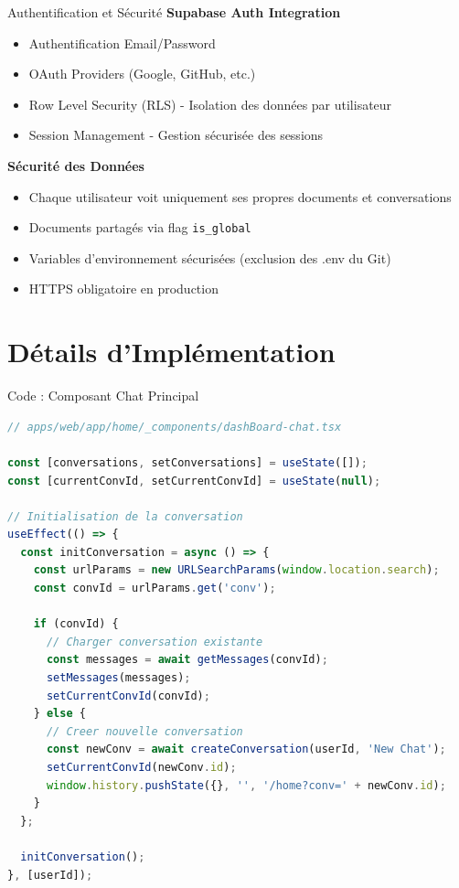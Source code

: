 \documentclass[aspectratio=169]{beamer}
\begin{document}
\begin{frame}{Authentification et Sécurité}
    \textbf{Supabase Auth Integration}
    \begin{itemize}
        \item \textcolor{primaryblue}{Authentification Email/Password}
        \item \textcolor{primaryblue}{OAuth Providers} (Google, GitHub, etc.)
        \item \textcolor{primaryblue}{Row Level Security (RLS)} - Isolation des données par utilisateur
        \item \textcolor{primaryblue}{Session Management} - Gestion sécurisée des sessions
    \end{itemize}
    
    \vspace{0.5cm}
    
    \textbf{Sécurité des Données}
    \begin{itemize}
        \item Chaque utilisateur voit uniquement ses propres documents et conversations
        \item Documents partagés via flag \texttt{is\_global}
        \item Variables d'environnement sécurisées (exclusion des .env du Git)
        \item HTTPS obligatoire en production
    \end{itemize}
\end{frame}

\section{Détails d'Implémentation}

\begin{frame}[fragile]{Code : Composant Chat Principal}
\begin{lstlisting}[language=JavaScript, basicstyle=\ttfamily\tiny]
// apps/web/app/home/_components/dashBoard-chat.tsx

const [conversations, setConversations] = useState([]);
const [currentConvId, setCurrentConvId] = useState(null);

// Initialisation de la conversation
useEffect(() => {
  const initConversation = async () => {
    const urlParams = new URLSearchParams(window.location.search);
    const convId = urlParams.get('conv');
    
    if (convId) {
      // Charger conversation existante
      const messages = await getMessages(convId);
      setMessages(messages);
      setCurrentConvId(convId);
    } else {
      // Creer nouvelle conversation
      const newConv = await createConversation(userId, 'New Chat');
      setCurrentConvId(newConv.id);
      window.history.pushState({}, '', '/home?conv=' + newConv.id);
    }
  };
  
  initConversation();
}, [userId]);
\end{lstlisting}
\end{frame}
\end{document}
